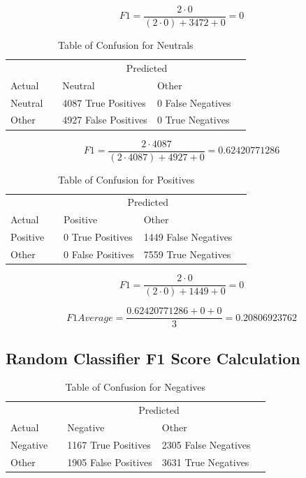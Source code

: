 \[F1 = \dfrac{2\cdot0}{(2\cdot0) + 3472 + 0} = 0\]


\begin{table}[H]
	\begin{tabular}{@{}lllll@{}}
		\toprule
		& & \multicolumn{2}{c}{Predicted} \\\cmidrule{2-4}
		Actual & & Neutral & Other & \\ \midrule
		Neutral & & 4087 True Positives & 0 False Negatives & \\
		Other  & & 4927 False Positives & 0 True Negatives & \\ \bottomrule
	\end{tabular}
	\centering
	\caption{Table of Confusion for Neutrals}
	\label{blneu}
\end{table}

\[F1 = \dfrac{2\cdot4087}{(2\cdot4087) + 4927 + 0} = 0.62420771286\]


\begin{table}[H]
	\begin{tabular}{@{}lllll@{}}
		\toprule
		& & \multicolumn{2}{c}{Predicted} \\\cmidrule{2-4}
		Actual & & Positive & Other & \\ \midrule
		Positive & & 0 True Positives & 1449 False Negatives & \\
		Other  & & 0 False Positives & 7559 True Negatives & \\ \bottomrule
	\end{tabular}
	\centering
	\caption{Table of Confusion for Positives}
	\label{blpos}
\end{table}


\[F1 = \dfrac{2\cdot0}{(2\cdot0) + 1449 + 0} = 0\]

\[F1 Average = \dfrac{0.62420771286+0+0}{3} = 0.20806923762\]

\subsection{Random Classifier F1 Score Calculation}

\begin{table}[H]
	\begin{tabular}{@{}lllll@{}}
		\toprule
		& & \multicolumn{2}{c}{Predicted} \\\cmidrule{2-4}
		Actual & & Negative & Other & \\ \midrule
		Negative & & 1167 True Positives & 2305 False Negatives & \\
		Other  & & 1905 False Positives & 3631 True Negatives & \\ \bottomrule
	\end{tabular}
	\centering
	\caption{Table of Confusion for Negatives}
	\label{randomneg}
\end{table}

